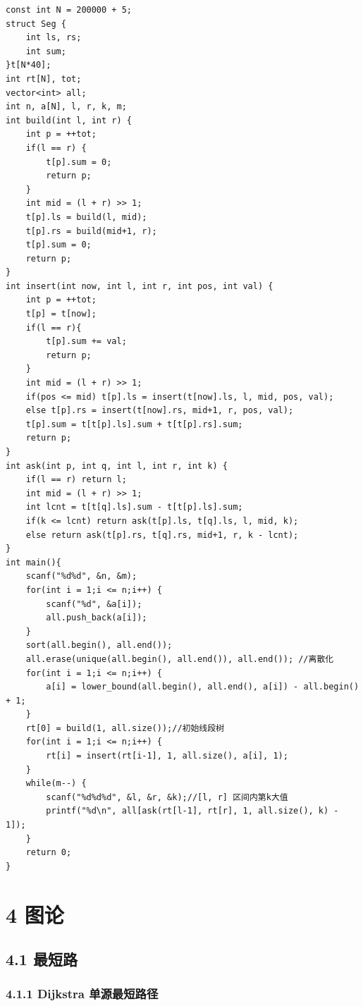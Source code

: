 \documentclass[11pt]{article}		%
\begin{document}
\begin{verbatim}
const int N = 200000 + 5;
struct Seg {
    int ls, rs;
    int sum;
}t[N*40];
int rt[N], tot;
vector<int> all;
int n, a[N], l, r, k, m;
int build(int l, int r) {
    int p = ++tot;
    if(l == r) {
        t[p].sum = 0;
        return p;
    }
    int mid = (l + r) >> 1;
    t[p].ls = build(l, mid);
    t[p].rs = build(mid+1, r);
    t[p].sum = 0;
    return p;
}
int insert(int now, int l, int r, int pos, int val) {
    int p = ++tot;
    t[p] = t[now];
    if(l == r){
        t[p].sum += val;
        return p;
    }
    int mid = (l + r) >> 1;
    if(pos <= mid) t[p].ls = insert(t[now].ls, l, mid, pos, val);
    else t[p].rs = insert(t[now].rs, mid+1, r, pos, val);
    t[p].sum = t[t[p].ls].sum + t[t[p].rs].sum;
    return p;
}
int ask(int p, int q, int l, int r, int k) {
    if(l == r) return l;
    int mid = (l + r) >> 1;
    int lcnt = t[t[q].ls].sum - t[t[p].ls].sum;
    if(k <= lcnt) return ask(t[p].ls, t[q].ls, l, mid, k);
    else return ask(t[p].rs, t[q].rs, mid+1, r, k - lcnt);
}
int main(){
    scanf("%d%d", &n, &m);
    for(int i = 1;i <= n;i++) {
        scanf("%d", &a[i]);
        all.push_back(a[i]);
    }
    sort(all.begin(), all.end());
    all.erase(unique(all.begin(), all.end()), all.end()); //离散化
    for(int i = 1;i <= n;i++) {
        a[i] = lower_bound(all.begin(), all.end(), a[i]) - all.begin() + 1;
    }
    rt[0] = build(1, all.size());//初始线段树
    for(int i = 1;i <= n;i++) {
        rt[i] = insert(rt[i-1], 1, all.size(), a[i], 1);
    }
    while(m--) {
        scanf("%d%d%d", &l, &r, &k);//[l, r] 区间内第k大值
        printf("%d\n", all[ask(rt[l-1], rt[r], 1, all.size(), k) - 1]);
    }
    return 0;
}
\end{verbatim}

\newpage

\pagestyle{fancy}


\section{4 图论}\label{ux56feux8bba}

\subsection{4.1 最短路}\label{ux6700ux77edux8def}

\subsubsection{4.1.1 Dijkstra
单源最短路径}\label{dijkstra-ux5355ux6e90ux6700ux77edux8defux5f84}
\end{document}
